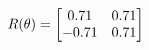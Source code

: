 \documentclass[preview]{standalone}
\begin{document}
\begin{align*}
\special{dvisvgm:raw <g id='unique000'>}R(\theta) = \begin{bmatrix}0.71 & 0.71\\-0.71 & 0.71\end{bmatrix}\special{dvisvgm:raw </g>}
\end{align*}
\end{document}
